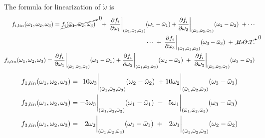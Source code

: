 \documentclass{article}
\begin{document}
  The formula for linearization of $\dot{\omega}$ is
  \begin{align*}
    f_{i, lin}(\omega_1,\omega_2, \omega_3) = \cancelto{0}{f_i(\bar{\omega}_1, \bar{\omega}_2, \bar{\omega}_3)} \hspace{3.0mm} + \hspace{1.0mm}
    \frac{\partial f_i}{\partial \omega_1}\bigg|_{(\bar{\omega}_1, \bar{\omega}_2, \bar{\omega}_3)}(\omega_1-\bar{\omega}_1) +
    \frac{\partial f_i}{\partial \omega_2}\bigg|_{(\bar{\omega}_1, \bar{\omega}_2, \bar{\omega}_3)}(\omega_2-\bar{\omega}_2) \hspace{1.0mm} + \cdots \\
    \cdots \hspace{1.0mm} + \hspace{1.0mm} \frac{\partial f_i}{\partial \omega_3}\bigg|_{(\bar{\omega}_1, \bar{\omega}_2, \bar{\omega}_3)}(\omega_3-\bar{\omega}_3) \hspace{1.0mm} + \hspace{1.0mm}
    \cancelto{0}{H.O.T.} \\ %
    f_{i, lin}(\omega_1,\omega_2, \omega_3) =
    \frac{\partial f_i}{\partial \omega_1}\bigg|_{(\bar{\omega}_1, \bar{\omega}_2, \bar{\omega}_3)}(\omega_1-\bar{\omega}_1) +
    \frac{\partial f_i}{\partial \omega_2}\bigg|_{(\bar{\omega}_1, \bar{\omega}_2, \bar{\omega}_3)}(\omega_2-\bar{\omega}_2) \hspace{1.0mm} + \hspace{1.0mm}
    \frac{\partial f_i}{\partial \omega_3}\bigg|_{(\bar{\omega}_1, \bar{\omega}_2, \bar{\omega}_3)}(\omega_3-\bar{\omega}_3) \\
  \end{align*}
  \begin{align*}
    f_{1, lin}(\omega_1,\omega_2, \omega_3) &=
    \hspace{1.4mm} 10\omega_3\bigg|_{(\bar{\omega}_1, \bar{\omega}_2, \bar{\omega}_3)}(\omega_2-\bar{\omega}_2) \hspace{1.0mm} + 
    10\omega_2\bigg|_{(\bar{\omega}_1, \bar{\omega}_2, \bar{\omega}_3)}(\omega_3-\bar{\omega}_3) \\
    f_{2, lin}(\omega_1,\omega_2, \omega_3) &=
    -5\omega_3\bigg|_{(\bar{\omega}_1, \bar{\omega}_2, \bar{\omega}_3)}(\omega_1-\bar{\omega}_1) \hspace{1.0mm} - \hspace{2.0mm}
    5\omega_1\bigg|_{(\bar{\omega}_1, \bar{\omega}_2, \bar{\omega}_3)}(\omega_3-\bar{\omega}_3) \\
    f_{3, lin}(\omega_1,\omega_2, \omega_3) &=
    \hspace{2.5mm} 2\omega_2\bigg|_{(\bar{\omega}_1, \bar{\omega}_2, \bar{\omega}_3)}(\omega_1-\bar{\omega}_1) \hspace{1.0mm} + \hspace{1.0mm}
    \hspace{1.5mm} 2\omega_1\bigg|_{(\bar{\omega}_1, \bar{\omega}_2, \bar{\omega}_3)}(\omega_2-\bar{\omega}_2) \\
     \end{align*}
\end{document}
